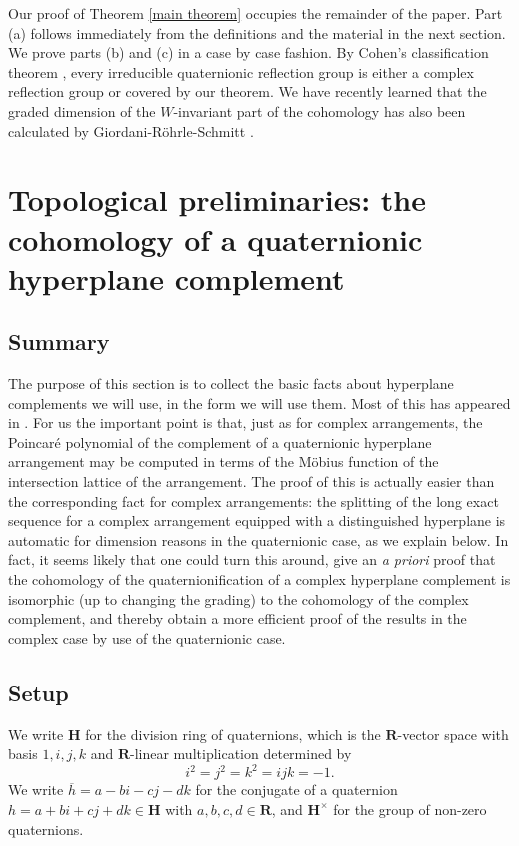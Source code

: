 \documentclass[11pt, reqno]{amsart}
\numberwithin{equation}{section}
\theoremstyle{definition}
\theoremstyle{plain}
\newcommand{\HH}{\mathbf{H}}
\newcommand{\RR}{\mathbf{R}}
\begin{document}
Our proof of Theorem \ref{main theorem} occupies the remainder of the paper. Part (a) follows immediately from the definitions and the material in the next section. We prove parts (b) and (c) in a case by case fashion. By Cohen's classification theorem \cite{Coh}, every irreducible quaternionic reflection group is either a complex reflection group or covered by our theorem. We have recently learned that the graded dimension of the $W$-invariant part of the cohomology has also been calculated by Giordani-Röhrle-Schmitt \cite{GRS}.

\section{Topological preliminaries: the cohomology of a quaternionic hyperplane complement}

\subsection{Summary} The purpose of this section is to collect the basic facts about hyperplane complements we will use, in the form we will use them. Most of this has appeared in \cite{Sch}. For us the important point is that, just as for complex arrangements, the Poincar\'e polynomial of the complement of a quaternionic hyperplane arrangement may be computed in terms of the M\"obius function of the intersection lattice of the arrangement. The proof of this is actually easier than the corresponding fact for complex arrangements: the splitting of the long exact sequence for a complex arrangement equipped with a distinguished hyperplane is automatic for dimension reasons in the quaternionic case, as we explain below. In fact, it seems likely that one could turn this around, give an \emph{a priori} proof that the cohomology of the quaternionification of a complex hyperplane complement is isomorphic (up to changing the grading) to the cohomology of the complex complement, and thereby obtain a more efficient proof of the results in the complex case by use of the quaternionic case.

\subsection{Setup} We write $\HH$ for the division ring of quaternions, which is the $\RR$-vector space with basis $1,i,j,k$ and $\RR$-linear multiplication determined by
$$i^2=j^2=k^2=ijk=-1.$$ We write $\overline{h}=a-bi-cj-dk$ for the conjugate of a quaternion $h=a+bi+cj+dk \in \HH$ with $a,b,c,d \in \RR$, and $\HH^\times$ for the group of non-zero quaternions.
\end{document}
